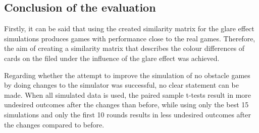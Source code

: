 

\subsection{Conclusion of the evaluation}
\label{conclusion_of_the_evaluation}
Firstly, it can be said that using the created similarity matrix for the glare effect simulations produces games with performance close to the real games. Therefore, the aim of creating a similarity matrix that describes the colour differences of cards on the filed under the influence of the glare effect was achieved. 

Regarding whether the attempt to improve the simulation of no obstacle games by doing changes to the simulator was successful, no clear statement can be made. When all simulated data is used, the paired sample t-tests result in more undesired outcomes after the changes than before, while using only the best 15 simulations and only the first 10 rounds results in less undesired outcomes after the changes compared to before. 


